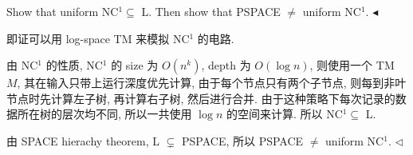 \documentclass[11pt]{article}
\newenvironment{problem}[2][Problem]{\begin{trivlist}
		\item[\hskip \labelsep {\bfseries #1}\hskip \labelsep {\bfseries #2.}]}{\hfill$\blacktriangleleft$\end{trivlist}}
\newenvironment{answer}[1][Answer]{\begin{trivlist}
		\item[\hskip \labelsep {\bfseries #1.}\hskip \labelsep]}{\hfill$\lhd$\end{trivlist}}
\begin{document}
	\begin{problem}{5.(21 points)}
		 Show that uniform NC$^1\subseteq$ L. Then show that PSPACE $\neq$ uniform NC$^1$.
	\end{problem}
	\begin{answer}
		即证可以用 log-space TM 来模拟 NC$^1$ 的电路.
		
		由 NC$^1$ 的性质, NC$^1$ 的 size 为 $O(n^k)$, depth 为 $O(\log n)$, 则使用一个 TM $M$, 其在输入只带上运行深度优先计算, 由于每个节点只有两个子节点, 则每到非叶节点时先计算左子树, 再计算右子树, 然后进行合并. 由于这种策略下每次记录的数据所在树的层次均不同, 所以一共使用 $\log n$ 的空间来计算. 所以 NC$^1\subseteq$ L. 
		
		由 SPACE hierachy theorem, L $\subsetneq$ PSPACE, 所以 PSPACE $\neq$ uniform NC$^1$.
	\end{answer}
\end{document}
